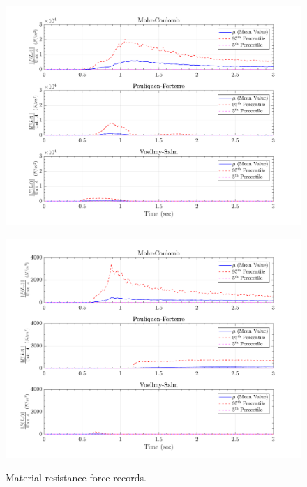 \documentclass{article}
\begin{document}
\begin{figure}[H]
	\begin{minipage}[b]{0.5\linewidth}
    	\centering
    	\includegraphics[width=1\textwidth]{InclinedPlane/LocalRecords/Records/Fr_L15.png}
    	\label{fig:Ramp-L3-Fr}
	\end{minipage}
	\begin{minipage}[b]{0.5\linewidth}
		\centering
		\includegraphics[width=1\textwidth]{InclinedPlane/LocalRecords/Records/Fr_L17.png}
    	\label{fig:Ramp-L4-Fr}
    \end{minipage}
    \caption{Material resistance force records.}
    \label{fig:Ramp-LM-Fr}
\end{figure}
\end{document}
